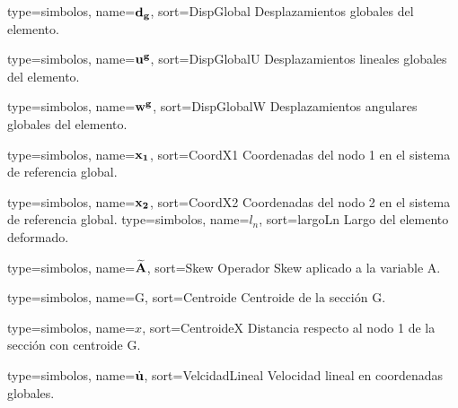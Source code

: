 {
	type={simbolos},
	name={$\bf{d}_g$}, %
	sort={DispGlobal} %
}
{Desplazamientos globales del elemento.}

{
	type={simbolos},
	name={$\bf{u}^g$}, %
	sort={DispGlobalU} %
}
{Desplazamientos lineales globales del elemento.}

{
	type={simbolos},
	name={$\bf{w}^g$}, %
	sort={DispGlobalW} %
}
{Desplazamientos angulares globales del elemento.}


{
	type={simbolos},
	name={$\bf{x}_1$}, %
	sort={CoordX1} %
}
{Coordenadas del nodo 1 en el sistema de referencia global.}

{
	type={simbolos},
	name={$\bf{x}_2$}, %
	sort={CoordX2} %
}
{Coordenadas del nodo 2 en el sistema de referencia global.}
{
	type={simbolos},
	name={$l_n$}, %
	sort={largoLn} %
}
{Largo del elemento deformado.}

{
	type={simbolos},
	name={$\widetilde{\bf{A}}$}, %
	sort={Skew} %
}
{Operador Skew aplicado a la variable A.}

{
	type={simbolos},
	name={G}, %
	sort={Centroide} %
}
{Centroide de la sección G.}


{
	type={simbolos},
	name={$x$}, %
	sort={CentroideX} %
}
{Distancia respecto al nodo 1 de la sección con centroide G.}

{
	type={simbolos},
	name={$\dot{\bf{u}}$}, %
	sort={VelcidadLineal} %
}
{Velocidad lineal en coordenadas globales.}

